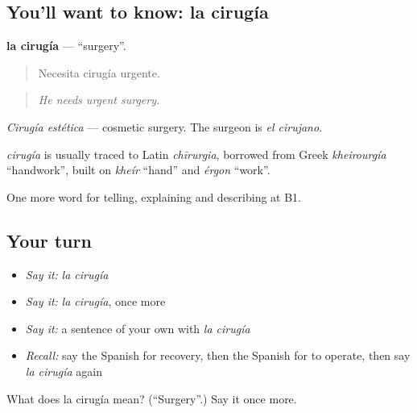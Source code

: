 \subsection*{You'll want to know: la cirugía}
\textbf{la cirugía} — \textquotedblleft{}surgery\textquotedblright{}.

\begin{quote}
Necesita cirugía urgente.
\end{quote}

\begin{quote}
\emph{He needs urgent surgery.}
\end{quote}

\emph{Cirugía estética} — cosmetic surgery. The surgeon is \emph{el cirujano}.

\begin{cousinweb}
\emph{cirugía} is usually traced to Latin \emph{chīrurgia}, borrowed from Greek \emph{kheirourgía} \textquotedblleft{}handwork\textquotedblright{}, built on \emph{kheír} \textquotedblleft{}hand\textquotedblright{} and \emph{érgon} \textquotedblleft{}work\textquotedblright{}.
\end{cousinweb}

\begin{grammarlens}[title={What you've built}]
One more word for telling, explaining and describing at B1.
\end{grammarlens}

\subsection*{Your turn}
\begin{itemize}
\raggedright
  \item \emph{Say it:} \emph{la cirugía}
  \item \emph{Say it:} \emph{la cirugía}, once more
  \item \emph{Say it:} a sentence of your own with \emph{la cirugía}
  \item \emph{Recall:} say the Spanish for recovery, then the Spanish for to operate, then say \emph{la cirugía} again
\end{itemize}

\begin{tcolorbox}[breakable,colback=teal!4,colframe=teal!35!black,title={Before you move on}]
What does la cirugía mean? (\textquotedblleft{}Surgery\textquotedblright{}.) Say it once more.
\end{tcolorbox}
